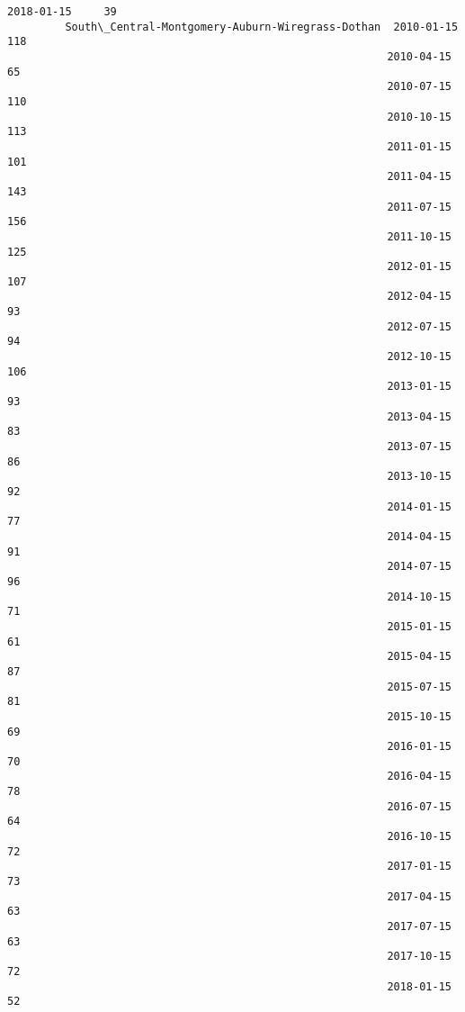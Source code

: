 \documentclass[11pt]{article}
\begin{document}
\begin{Verbatim}[commandchars=\\\{\}]
                                                           2018-01-15     39
         South\_Central-Montgomery-Auburn-Wiregrass-Dothan  2010-01-15    118
                                                           2010-04-15     65
                                                           2010-07-15    110
                                                           2010-10-15    113
                                                           2011-01-15    101
                                                           2011-04-15    143
                                                           2011-07-15    156
                                                           2011-10-15    125
                                                           2012-01-15    107
                                                           2012-04-15     93
                                                           2012-07-15     94
                                                           2012-10-15    106
                                                           2013-01-15     93
                                                           2013-04-15     83
                                                           2013-07-15     86
                                                           2013-10-15     92
                                                           2014-01-15     77
                                                           2014-04-15     91
                                                           2014-07-15     96
                                                           2014-10-15     71
                                                           2015-01-15     61
                                                           2015-04-15     87
                                                           2015-07-15     81
                                                           2015-10-15     69
                                                           2016-01-15     70
                                                           2016-04-15     78
                                                           2016-07-15     64
                                                           2016-10-15     72
                                                           2017-01-15     73
                                                           2017-04-15     63
                                                           2017-07-15     63
                                                           2017-10-15     72
                                                           2018-01-15     52

\end{Verbatim}
\end{document}

